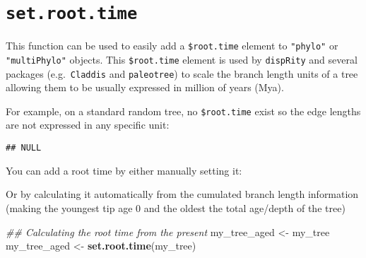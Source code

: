 \documentclass[
]{book}
\newenvironment{Shaded}{\begin{snugshade}}{\end{snugshade}}
\newcommand{\CommentTok}[1]{\textcolor[rgb]{0.56,0.35,0.01}{\textit{#1}}}
\newcommand{\DecValTok}[1]{\textcolor[rgb]{0.00,0.00,0.81}{#1}}
\newcommand{\KeywordTok}[1]{\textcolor[rgb]{0.13,0.29,0.53}{\textbf{#1}}}
\newcommand{\NormalTok}[1]{#1}
\newcommand{\OperatorTok}[1]{\textcolor[rgb]{0.81,0.36,0.00}{\textbf{#1}}}
\newcommand{\StringTok}[1]{\textcolor[rgb]{0.31,0.60,0.02}{#1}}
\begin{document}
\hypertarget{set.root.time}{%
\section{\texorpdfstring{\texttt{set.root.time}}{set.root.time}}\label{set.root.time}}

This function can be used to easily add a \texttt{\$root.time} element to \texttt{"phylo"} or \texttt{"multiPhylo"} objects.
This \texttt{\$root.time} element is used by \texttt{dispRity} and several packages (e.g.~\texttt{Claddis} and \texttt{paleotree}) to scale the branch length units of a tree allowing them to be usually expressed in million of years (Mya).

For example, on a standard random tree, no \texttt{\$root.time} exist so the edge lengths are not expressed in any specific unit:

\begin{Shaded}
\end{Shaded}

\begin{verbatim}
## NULL
\end{verbatim}

You can add a root time by either manually setting it:

\begin{Shaded}
\end{Shaded}

Or by calculating it automatically from the cumulated branch length information (making the youngest tip age 0 and the oldest the total age/depth of the tree)

\begin{Shaded}
\begin{Highlighting}[]
\CommentTok{\#\# Calculating the root time from the present}
\NormalTok{my\_tree\_aged \textless{}{-}}\StringTok{ }\NormalTok{my\_tree }
\NormalTok{my\_tree\_aged \textless{}{-}}\StringTok{ }\KeywordTok{set.root.time}\NormalTok{(my\_tree)}
\end{Highlighting}
\end{Shaded}
\end{document}
